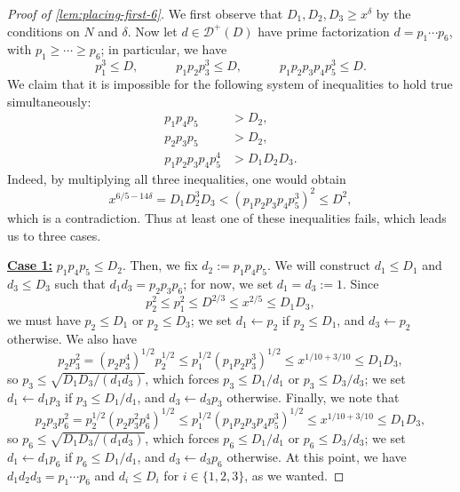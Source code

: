 \documentclass[reqno,11pt]{amsart}
\theoremstyle{remark}
\numberwithin{equation}{section}
\newcommand{\mD}{\mathcal{D}}
\begin{document}
\begin{proof}[Proof of \cref{lem:placing-first-6}]
We first observe that $D_1, D_2, D_3 \ge x^\delta$ by the conditions on $N$ and $\delta$. Now let $d \in \mD^+(D)$ have prime factorization $d = p_1 \cdots p_6$, with $p_1 \ge \cdots \ge p_6$; in particular, we have
\[
    p_1^3 \le D, \qquad\quad
    p_1 p_2 p_3^3 \le D, \qquad\quad 
    p_1 p_2 p_3 p_4 p_5^3 \le D.
\]
We claim that it is impossible for the following system of inequalities to hold true simultaneously:
\[
\begin{aligned}
    p_1 p_4 p_5 &> D_2, \\
    p_2 p_3 p_5 &> D_2, \\
    p_1 p_2 p_3 p_4 p_5^4 &> D_1 D_2 D_3.
\end{aligned}
\]
Indeed, by multiplying all three inequalities, one would obtain
\[
    x^{6/5 - 14\delta} = D_1 D_2^3 D_3 < (p_1 p_2 p_3 p_4 p_5^3)^2 
    \le 
    D^2,
\]
which is a contradiction. Thus at least one of these inequalities fails, which leads us to three cases.

\underline{\textbf{Case 1:}} $p_1 p_4 p_5 \le D_2$. Then, we fix $d_2 := p_1 p_4 p_5$. We will construct $d_1 \le D_1$ and $d_3 \le D_3$ such that $d_1 d_3 = p_2 p_3 p_6$; for now, we set $d_1 = d_3 := 1$. Since 
\[
    p_2^2 \le p_1^2 \le D^{2/3} \le x^{2/5} \le D_1 D_3,
\]
we must have $p_2 \le D_1$ or $p_2 \le D_3$; we set $d_1 \gets p_2$ if $p_2 \le D_1$, and $d_3 \gets p_2$ otherwise. We also have
\[
    p_2 p_3^2 = \left(p_2 p_3^4\right)^{1/2} p_2^{1/2} 
    \le 
    p_1^{1/2} \left(p_1 p_2 p_3^3\right)^{1/2} 
    \le x^{1/10 + 3/10} \le D_1 D_3,
\]
so $p_3 \le \sqrt{D_1 D_3/(d_1 d_3)}$, which forces $p_3 \le D_1/d_1$ or $p_3 \le D_3/d_3$; we set $d_1 \gets d_1 p_3$ if $p_3 \le D_1/d_1$, and $d_3 \gets d_3 p_3$ otherwise. Finally, we note that
\[
    p_2 p_3 p_6^2 = p_2^{1/2} \left(p_2 p_3^2 p_6^4\right)^{1/2}
    \le
    p_1^{1/2} \left(p_1 p_2 p_3 p_4 p_5^3\right)^{1/2}
    \le 
    x^{1/10 + 3/10} \le D_1 D_3,
\]
so $p_6 \le \sqrt{D_1 D_3/(d_1 d_3)}$, which forces $p_6 \le D_1/d_1$ or $p_6 \le D_3/d_3$; we set $d_1 \gets d_1 p_6$ if $p_6 \le D_1/d_1$, and $d_3 \gets d_3 p_6$ otherwise. At this point, we have $d_1 d_2 d_3 = p_1 \cdots p_6$ and $d_i \le D_i$ for $i \in \{1, 2, 3\}$, as we wanted.


\end{proof}
\end{document}
